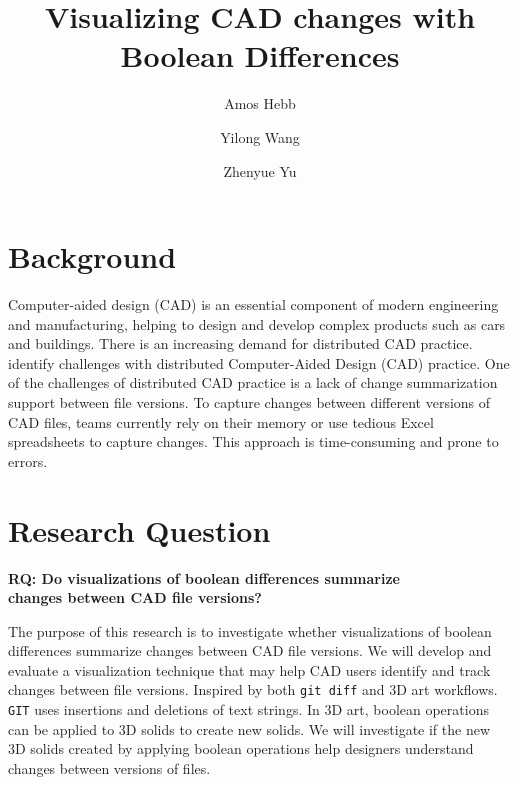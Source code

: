 \documentclass[sigconf,authorversion,nonacm]{acmart}
\begin{document}
\title{Visualizing CAD changes with Boolean Differences}

\author{Amos Hebb}
\author{Yilong Wang}
\author{Zhenyue Yu}
\makeatletter
\def\@ACM@checkaffil{%
	\if@ACM@instpresent\else
		\ClassWarningNoLine{\@classname}{No institution present for an affiliation}%
	\fi
	\if@ACM@citypresent\else
		\ClassWarningNoLine{\@classname}{No city present for an affiliation}%
	\fi
	\if@ACM@countrypresent\else
		\ClassWarningNoLine{\@classname}{No country present for an affiliation}%
	\fi
}
\makeatother

\maketitle

\section{Background}

Computer-aided design (CAD) is an essential component of modern engineering and manufacturing, helping to design and develop complex products such as cars and buildings. There is an increasing demand for distributed CAD practice. \citet{cheng2023age} identify challenges with distributed Computer-Aided Design (CAD) practice. One of the challenges of distributed CAD practice is a lack of change summarization support between file versions. To capture changes between different versions of CAD files, teams currently rely on their memory or use tedious Excel spreadsheets to capture changes. This approach is time-consuming and prone to errors.
\section{Research Question}

\textbf{RQ: Do visualizations of boolean differences summarize\\changes between CAD file versions?}

The purpose of this research is to investigate whether visualizations of boolean differences summarize changes between CAD file versions. We will develop and evaluate a visualization technique that may help CAD users identify and track changes between file versions. Inspired by both \texttt{git diff} and 3D art workflows. \texttt{GIT} uses insertions and deletions of text strings. In 3D art, boolean operations can be applied to 3D solids to create new solids. We will investigate if the new 3D solids created by applying boolean operations help designers understand changes between versions of files.
\end{document}
